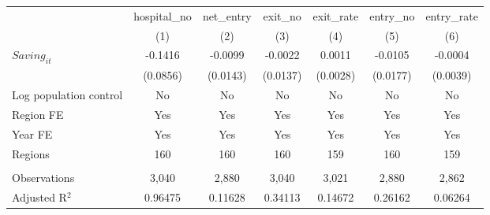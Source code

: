 \begingroup
\centering
\begin{tabular}{lcccccc}
   \toprule
                          & hospital\_no  & net\_entry  & exit\_no  & exit\_rate  & entry\_no  & entry\_rate \\    
                          & (1)           & (2)         & (3)       & (4)         & (5)        & (6)\\  
   \midrule 
   $Saving_{it}$          & -0.1416       & -0.0099     & -0.0022   & 0.0011      & -0.0105    & -0.0004\\   
                          & (0.0856)      & (0.0143)    & (0.0137)  & (0.0028)    & (0.0177)   & (0.0039)\\   
   Log population control & No            & No          & No        & No          & No         & No\\  
   Region FE              & Yes           & Yes         & Yes       & Yes         & Yes        & Yes\\  
   Year FE                & Yes           & Yes         & Yes       & Yes         & Yes        & Yes\\  
   Regions                & 160           & 160         & 160       & 159         & 160        & 159\\  
    \\
   Observations           & 3,040         & 2,880       & 3,040     & 3,021       & 2,880      & 2,862\\  
   Adjusted R$^2$         & 0.96475       & 0.11628     & 0.34113   & 0.14672     & 0.26162    & 0.06264\\  
   \bottomrule
\end{tabular}
\par\endgroup
